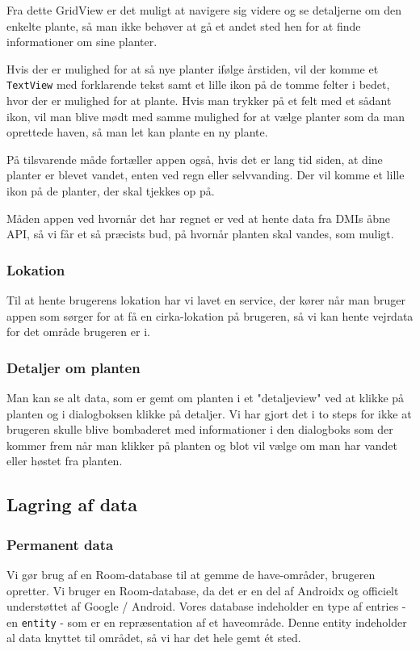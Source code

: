Fra dette GridView er det muligt at navigere sig videre og se detaljerne om den enkelte plante, så man ikke behøver at gå et andet sted hen for at finde informationer om sine planter.

Hvis der er mulighed for at så nye planter ifølge årstiden, vil der komme et \texttt{TextView} med forklarende tekst samt et lille ikon på de tomme felter i bedet, hvor der er mulighed for at plante. Hvis man trykker på et felt med et sådant ikon, vil man blive mødt med samme mulighed for at vælge planter som da man oprettede haven, så man let kan plante en ny plante.

På tilsvarende måde fortæller appen også, hvis det er lang tid siden, at dine planter er blevet vandet, enten ved regn eller selvvanding. Der vil komme et lille ikon på de planter, der skal tjekkes op på.

Måden appen ved hvornår det har regnet er ved at hente data fra DMIs åbne API, så vi får et så præcists bud, på hvornår planten skal vandes, som muligt.

\subsubsection{Lokation}

Til at hente brugerens lokation har vi lavet en service, der kører når man bruger appen som sørger for at få en cirka-lokation på brugeren, så vi kan hente vejrdata for det område brugeren er i.

\subsubsection{Detaljer om planten}

Man kan se alt data, som er gemt om planten i et "detaljeview" ved at klikke på planten og i dialogboksen klikke på detaljer. Vi har gjort det i to steps for ikke at brugeren skulle blive bombaderet med informationer i den dialogboks som der kommer frem når man klikker på planten og blot vil vælge om man har vandet eller høstet fra planten.

\subsection{Lagring af data}

\subsubsection{Permanent data}
Vi gør brug af en Room-database til at gemme de have-områder, brugeren opretter. Vi bruger en Room-database, da det er en del af Androidx og officielt understøttet af Google / Android. Vores database indeholder en type af entries - en \texttt{entity} - som er en repræsentation af et haveområde. Denne entity indeholder al data knyttet til området, så vi har det hele gemt ét sted.

